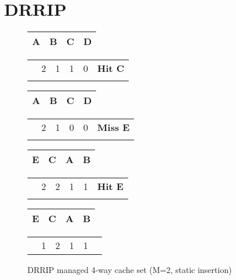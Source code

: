 \section{DRRIP}
\label{sec:algorithms:drrip}

\begin{figure}[ht]
    \centering
    \begin{tabular}{|p{2cm}|p{2cm}|p{2cm}|p{2cm}|}
        \hline
        A & B & C & D \\
        \hline
    \end{tabular}
    \begin{tabular}{p{2cm}p{2cm}p{2cm}p{2cm}p{2cm}p{2cm}}
        & 2 & 1 & 1 & 0 & \bf{Hit C} \\
        &   &   &   &   &
    \end{tabular}    

    \begin{tabular}{|p{2cm}|p{2cm}|p{2cm}|p{2cm}|}
        \hline
        A & B & C & D \\
        \hline
    \end{tabular}
    \begin{tabular}{p{2cm}p{2cm}p{2cm}p{2cm}p{2cm}p{2cm}}
        & 2 & 1 & 0 & 0 & \bf{Miss E} \\
        &   &   &   &   &
    \end{tabular}     

    \begin{tabular}{|p{2cm}|p{2cm}|p{2cm}|p{2cm}|}
        \hline
        E & C & A & B \\
        \hline
    \end{tabular}
    \begin{tabular}{p{2cm}p{2cm}p{2cm}p{2cm}p{2cm}p{2cm}}
        & 2 & 2 & 1 & 1 & \bf{Hit E} \\
        &   &   &   &   &
    \end{tabular}    

    \begin{tabular}{|p{2cm}|p{2cm}|p{2cm}|p{2cm}|}
        \hline
        E & C & A & B \\
        \hline
    \end{tabular}
    \begin{tabular}{p{2cm}p{2cm}p{2cm}p{2cm}p{2cm}p{2cm}}
        & 1 & 2 & 1 & 1 & 
    \end{tabular} 

    \caption{DRRIP managed 4-way cache set (M=2, static insertion)}
    \label{fig:algorithms:drrip_example}
\end{figure}

